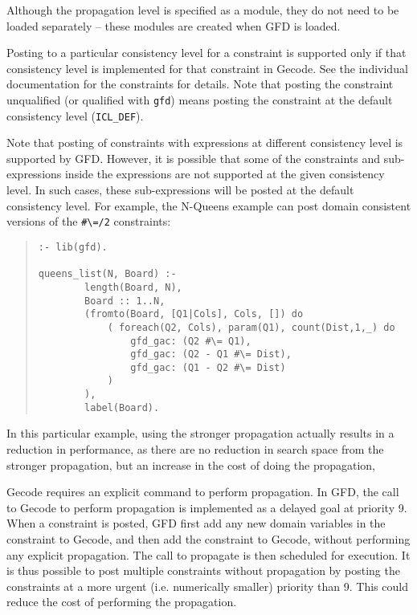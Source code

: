 Although the propagation level is specified as a module, they do not need to
be loaded separately -- these modules are created when GFD is loaded.

Posting to a particular consistency level for a constraint is supported only
if that consistency level is implemented for that constraint
in Gecode. See the individual documentation for the constraints for details.
Note that posting the constraint unqualified (or qualified with {\tt gfd}) 
means posting the constraint at the default consistency level ({\tt ICL_DEF}). 

Note that posting of constraints with expressions at different 
consistency level is supported by GFD. However, it is possible that some of
the constraints and sub-expressions inside the expressions are not supported
at the given consistency level. In such cases, these sub-expressions will be
posted at the default consistency level. For example, the N-Queens example
can post domain consistent versions of the \verb'#\=/2' constraints:

\begin{quote}
\begin{verbatim}
:- lib(gfd).

queens_list(N, Board) :-
        length(Board, N),
        Board :: 1..N,
        (fromto(Board, [Q1|Cols], Cols, []) do
            ( foreach(Q2, Cols), param(Q1), count(Dist,1,_) do
                gfd_gac: (Q2 #\= Q1),
                gfd_gac: (Q2 - Q1 #\= Dist),
                gfd_gac: (Q1 - Q2 #\= Dist)
            )
        ),
        label(Board).

\end{verbatim}
\end{quote}
In this particular example, using the stronger propagation actually results in
a reduction in performance, as there are no reduction in search space from the
stronger propagation, but an increase in the cost of doing the propagation, 


Gecode requires an explicit command to perform propagation. In GFD,
the call to Gecode to perform propagation is implemented as a delayed
 goal at priority 9.
When a constraint is posted, GFD first add any new domain variables in
 the constraint to Gecode, and then add the constraint to Gecode,
 without performing any explicit propagation. The call to propagate is
then scheduled for execution. It is thus possible to post multiple
 constraints without propagation by posting the constraints at a more
urgent (i.e. numerically smaller) priority than 9. This could reduce
 the cost of performing the propagation.
 
